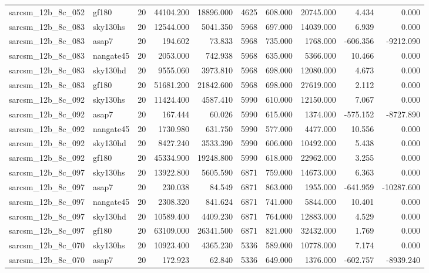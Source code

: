 \begin{tabular}{llrrrrrrrr}
sarcsm\_12b\_8c\_052 & gf180 & 20 & 44104.200 & 18896.000 & 4625 & 608.000 & 20745.000 & 4.434 & 0.000 \\
sarcsm\_12b\_8c\_083 & sky130hs & 20 & 12544.000 & 5041.350 & 5968 & 697.000 & 14039.000 & 6.939 & 0.000 \\
sarcsm\_12b\_8c\_083 & asap7 & 20 & 194.602 & 73.833 & 5968 & 735.000 & 1768.000 & -606.356 & -9212.090 \\
sarcsm\_12b\_8c\_083 & nangate45 & 20 & 2053.000 & 742.938 & 5968 & 635.000 & 5366.000 & 10.466 & 0.000 \\
sarcsm\_12b\_8c\_083 & sky130hd & 20 & 9555.060 & 3973.810 & 5968 & 698.000 & 12080.000 & 4.673 & 0.000 \\
sarcsm\_12b\_8c\_083 & gf180 & 20 & 51681.200 & 21842.600 & 5968 & 698.000 & 27619.000 & 2.112 & 0.000 \\
sarcsm\_12b\_8c\_092 & sky130hs & 20 & 11424.400 & 4587.410 & 5990 & 610.000 & 12150.000 & 7.067 & 0.000 \\
sarcsm\_12b\_8c\_092 & asap7 & 20 & 167.444 & 60.026 & 5990 & 615.000 & 1374.000 & -575.152 & -8727.890 \\
sarcsm\_12b\_8c\_092 & nangate45 & 20 & 1730.980 & 631.750 & 5990 & 577.000 & 4477.000 & 10.556 & 0.000 \\
sarcsm\_12b\_8c\_092 & sky130hd & 20 & 8427.240 & 3533.390 & 5990 & 606.000 & 10492.000 & 5.438 & 0.000 \\
sarcsm\_12b\_8c\_092 & gf180 & 20 & 45334.900 & 19248.800 & 5990 & 618.000 & 22962.000 & 3.255 & 0.000 \\
sarcsm\_12b\_8c\_097 & sky130hs & 20 & 13922.800 & 5605.590 & 6871 & 759.000 & 14673.000 & 6.363 & 0.000 \\
sarcsm\_12b\_8c\_097 & asap7 & 20 & 230.038 & 84.549 & 6871 & 863.000 & 1955.000 & -641.959 & -10287.600 \\
sarcsm\_12b\_8c\_097 & nangate45 & 20 & 2308.320 & 841.624 & 6871 & 741.000 & 5844.000 & 10.401 & 0.000 \\
sarcsm\_12b\_8c\_097 & sky130hd & 20 & 10589.400 & 4409.230 & 6871 & 764.000 & 12883.000 & 4.529 & 0.000 \\
sarcsm\_12b\_8c\_097 & gf180 & 20 & 63109.000 & 26341.500 & 6871 & 821.000 & 32432.000 & 1.769 & 0.000 \\
sarcsm\_12b\_8c\_070 & sky130hs & 20 & 10923.400 & 4365.230 & 5336 & 589.000 & 10778.000 & 7.174 & 0.000 \\
sarcsm\_12b\_8c\_070 & asap7 & 20 & 172.923 & 62.840 & 5336 & 649.000 & 1376.000 & -602.757 & -8939.240 \\

\end{tabular}
